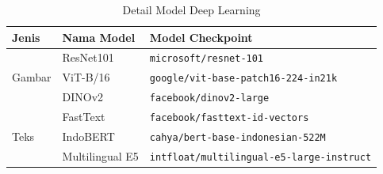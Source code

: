 \begin{table}[htbp]
    \centering
    \caption{Detail Model Deep Learning}
    \label{tab:model-all}
    \begin{tabular}{lll}
        \toprule
        \textbf{Jenis} & \textbf{Nama Model} & \textbf{Model Checkpoint} \\
        \midrule
        \multirow{3}{*}{Gambar} 
        & ResNet101 & \texttt{microsoft/resnet-101} \\
        & ViT-B/16 & \texttt{google/vit-base-patch16-224-in21k} \\
        & DINOv2 & \texttt{facebook/dinov2-large} \\
        \midrule
        \multirow{3}{*}{Teks}
        & FastText & \texttt{facebook/fasttext-id-vectors} \\
        & IndoBERT & \texttt{cahya/bert-base-indonesian-522M} \\
        & Multilingual E5 & \texttt{intfloat/multilingual-e5-large-instruct} \\
        \bottomrule
    \end{tabular}
\end{table}